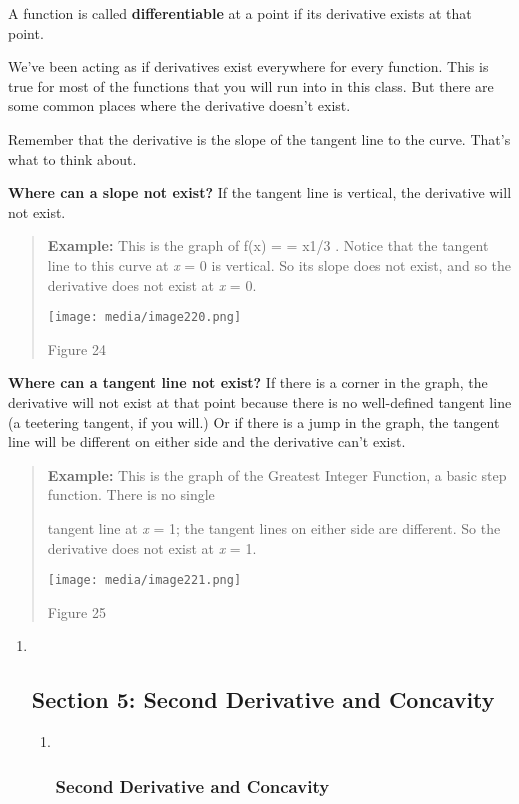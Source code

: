 A function is called \textbf{differentiable} at a point if its
derivative exists at that point.

We've been acting as if derivatives exist everywhere for every function.
This is true for most of the functions that you will run into in this
class. But there are some common places where the derivative doesn't
exist.

Remember that the derivative is the slope of the tangent line to the
curve. That's what to think about.

\textbf{Where can a slope not exist?} If the tangent line is vertical,
the derivative will not exist.

\begin{quote}
\textbf{Example:} This is the graph of f(x) = = x1/3 . Notice that the
tangent line to this curve at \emph{x} = 0 is vertical. So its slope
does not exist, and so the derivative does not exist at \emph{x} = 0.

\texttt{[image: media/image220.png]}

Figure 24
\end{quote}

\textbf{Where can a tangent line not exist?} If there is a corner in the
graph, the derivative will not exist at that point because there is no
well-defined tangent line (a teetering tangent, if you will.) Or if
there is a jump in the graph, the tangent line will be different on
either side and the derivative can't exist.

\begin{quote}
\textbf{Example:} This is the graph of the Greatest Integer Function, a
basic step function. There is no single

tangent line at \emph{x} = 1; the tangent lines on either side are
different. So the derivative does not exist at \emph{x} = 1.

\texttt{[image: media/image221.png]}

Figure 25
\end{quote}

\begin{enumerate}
\item ~
  \hypertarget{section-5-second-derivative-and-concavity}{\subsection{Section
  5: Second Derivative and
  Concavity}\label{section-5-second-derivative-and-concavity}}

  \begin{enumerate}
  \item ~
    \subsubsection{Second Derivative and
    Concavity}\label{second-derivative-and-concavity}
  \end{enumerate}
\end{enumerate}

